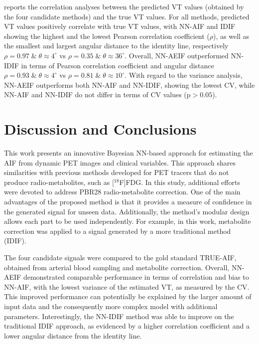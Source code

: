         
        reports the correlation analyses between the predicted \gls{VT} values (obtained by the four candidate methods) and the true \gls{VT} values. For all methods, predicted \gls{VT} values positively correlate with true \gls{VT} values, with \gls{NN}-\gls{AIF} and \gls{IDIF} showing the highest and the lowest Pearson correlation coefficient ($\rho$), as well as the smallest and largest angular distance to the identity line, respectively $\rho = 0.97 \; \& \;  \theta \approx 4^{\circ}$ vs $\rho = 0.35 \; \&  \; \theta \approx 36^{\circ}$. Overall, \gls{NN}-\gls{AE}\gls{IF} outperformed \gls{NN}-\gls{IDIF} in terms of Pearson correlation coefficient and angular distance $\rho = 0.93 \; \& \; \theta  \approx 4^{\circ}$ vs $\rho = 0.81 \; \&  \; \theta \approx 10^{\circ}$. With regard to the variance analysis, \gls{NN}-\gls{AE}\gls{IF} outperforms both \gls{NN}-\gls{AIF} and \gls{NN}-\gls{IDIF}, showing the lowest \gls{CV}, while \gls{NN}-\gls{AIF} and \gls{NN}-\gls{IDIF} do not differ in terms of \gls{CV} values (p$>0.05$).
    
    \section{Discussion and Conclusions} \label{sec:a_bayesian_neural_network-based_method_for_the_extraction_of_a_metabolite_corrected_arterial_input_function_from_dynamic_pbr28_pet_appendix_discussion_and_conclusions}
        This work presents an innovative Bayesian \gls{NN}-based approach for estimating the \gls{AIF} from dynamic \gls{PET} images and clinical variables. This approach shares similarities with previous methods developed for \gls{PET} tracers that do not produce radio-metabolites, such as [$^{18}$F]\gls{FDG}. In this study, additional efforts were devoted to address \gls{PBR28} radio-metabolite correction. One of the main advantages of the proposed method is that it provides a measure of confidence in the generated signal for unseen data. Additionally, the method's modular design allows each part to be used independently. For example, in this work, metabolite correction was applied to a signal generated by a more traditional method (\gls{IDIF}). 
        
        The four candidate signals were compared to the gold standard TRUE-\gls{AIF}, obtained from arterial blood sampling and metabolite correction. Overall, \gls{NN}-\gls{AE}\gls{IF} demonstrated comparable performance in terms of correlation and bias to \gls{NN}-\gls{AIF}, with the lowest variance of the estimated \gls{VT}, as measured by the \gls{CV}. This improved performance can potentially be explained by the larger amount of input data and the consequently more complex model with additional parameters. Interestingly, the \gls{NN}-\gls{IDIF} method was able to improve on the traditional \gls{IDIF} approach, as evidenced by a higher correlation coefficient and a lower angular distance from the identity line.
        
